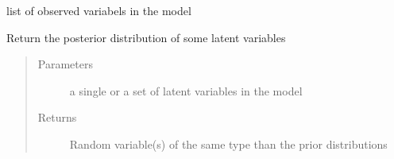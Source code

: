 \documentclass[letterpaper,10pt,english]{sphinxmanual}
\begin{document}
\begin{fulllineitems}
\begin{fulllineitems}
\label{\detokenize{modules/inferpy.models:inferpy.models.prob_model.ProbModel.no_parents}}
\end{fulllineitems}


\begin{fulllineitems}
\label{\detokenize{modules/inferpy.models:inferpy.models.prob_model.ProbModel.observed_vars}}
list of observed variabels in the model

\end{fulllineitems}


\begin{fulllineitems}
\label{\detokenize{modules/inferpy.models:inferpy.models.prob_model.ProbModel.posterior}}
Return the posterior distribution of some latent variables
\begin{quote}\begin{description}
\item[{Parameters}] \leavevmode
{} \textendash{} a single or a set of latent variables in the model

\item[{Returns}] \leavevmode
Random variable(s) of the same type than the prior distributions

\end{description}\end{quote}

\end{fulllineitems}


\begin{fulllineitems}
\label{\detokenize{modules/inferpy.models:inferpy.models.prob_model.ProbModel.predict}}
\end{fulllineitems}


\begin{fulllineitems}
\label{\detokenize{modules/inferpy.models:inferpy.models.prob_model.ProbModel.predict_old}}
\end{fulllineitems}


\end{fulllineitems}
\end{document}
